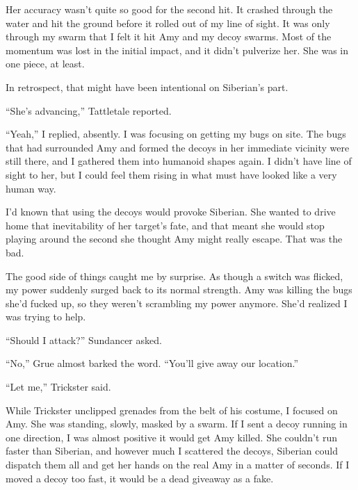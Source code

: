 Her accuracy wasn't quite so good for the second hit.  It crashed through the water and hit the ground before it rolled out of my line of sight.  It was only through my swarm that I felt it hit Amy and my decoy swarms.  Most of the momentum was lost in the initial impact, and it didn't pulverize her.  She was in one piece, at least.



In retrospect, that might have been intentional on Siberian's part.



``She's advancing,'' Tattletale reported.



``Yeah,'' I replied, absently.  I was focusing on getting my bugs on site.  The bugs that had surrounded Amy and formed the decoys in her immediate vicinity were still there, and I gathered them into humanoid shapes again.  I didn't have line of sight to her, but I could feel them rising in what must have looked like a very human way.



I'd known that using the decoys would provoke Siberian.  She wanted to drive home that inevitability of her target's fate, and that meant she would stop playing around the second she thought Amy might really escape.  That was the bad.



The good side of things caught me by surprise.  As though a switch was flicked, my power suddenly surged back to its normal strength.  Amy was killing the bugs she'd fucked up, so they weren't scrambling my power anymore.  She'd realized I was trying to help.



``Should I attack?''  Sundancer asked.



``No,'' Grue almost barked the word.  ``You'll give away our location.''



``Let me,'' Trickster said.



While Trickster unclipped grenades from the belt of his costume, I focused on Amy.  She was standing, slowly, masked by a swarm.  If I sent a decoy running in one direction, I was almost positive it would get Amy killed.  She couldn't run faster than Siberian, and however much I scattered the decoys, Siberian could dispatch them all and get her hands on the real Amy in a matter of seconds.  If I moved a decoy too fast, it would be a dead giveaway as a fake.



